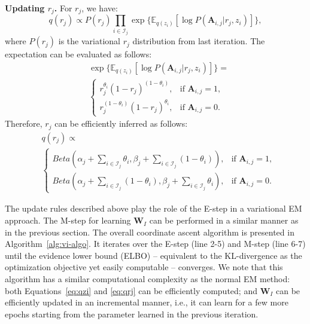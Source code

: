 \smallskip
\noindent\textbf{Updating $r_j$.}  For $r_j$, we have:
%
\begin{equation}
    q(r_j) \propto {P(r_j)} \prod_{i \in \mathcal{I}_j} \exp{\{\mathbb{E}_{q(z_i)}[\log{P(\mathbf{A}_{i,j}|r_j,z_i)}]\}} ,
\end{equation}
%
where $P(r_j)$ is the variational $r_j$ distribution from last iteration. The expectation can be evaluated as follows:
%
\begin{align}  
& \exp{\{\mathbb{E}_{q(z_i)}[\log{P(\mathbf{A}_{i,j}|r_j,z_i)}]\}} = \nonumber \\
& 
\left\{  
    \begin{array}{lr}
        r_j^{\theta_i}  (1-r_j)^{(1 - \theta_i)}, &  \text{if\ } \mathbf{A}_{i,j}=1,\\  
        r_j^{(1 - \theta_i)} (1-r_j)^{\theta_i}, &  \text{if\ } \mathbf{A}_{i,j}=0.   
    \end{array}  
\right. 
\end{align}
%
Therefore, $r_j$ can be efficiently inferred as follows:
%
\begin{align}  
& q(r_j)  \propto \nonumber \\
& 
\left\{  
    \begin{array}{lr}
        Beta(\alpha_j+\sum_{i\in \mathcal{I}_j}  \theta_i,\beta_j+ \sum_{i\in \mathcal{I}_j} (1 - \theta_i) ), &  \text{if\ } \mathbf{A}_{i,j}=1,\\  
        Beta(\alpha_j+\sum_{i\in \mathcal{I}_j} (1 - \theta_i),\beta_j+ \sum_{i\in \mathcal{I}_j} \theta_i), &  \text{if\ } \mathbf{A}_{i,j}=0.   
    \end{array}  
\right. 
\label{eq:qrj}
\end{align}



The update rules described above play the role of the E-step in a variational EM approach. 
The M-step for learning $\mathbf{W}_I$ can be performed in a similar manner as in the previous section. The overall coordinate ascent algorithm is presented in Algorithm~\ref{alg:vi-algo}. It iterates over the E-step (line 2-5) and M-step (line 6-7) until the evidence lower bound (ELBO) \cite{blei2017variational} -- equivalent to the KL-divergence as the optimization objective yet easily computable -- converges. We note that this algorithm has a similar computational complexity as the normal EM method: both Equations~\ref{eq:qzi} and \ref{eq:qrj} can be efficiently computed; and $\mathbf{W}_I$ can be efficiently updated in an incremental manner, i.e., it can learn for a few more epochs starting from the parameter learned in the previous iteration.


